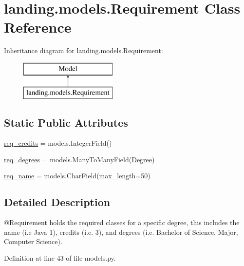 \hypertarget{classlanding_1_1models_1_1Requirement}{}\section{landing.\+models.\+Requirement Class Reference}
\label{classlanding_1_1models_1_1Requirement}
Inheritance diagram for landing.\+models.\+Requirement\+:\begin{figure}[H]
\begin{center}
\leavevmode
\includegraphics[height=2.000000cm]{classlanding_1_1models_1_1Requirement}
\end{center}
\end{figure}
\subsection*{Static Public Attributes}
\begin{DoxyCompactItemize}
\item 
\mbox{\hyperlink{classlanding_1_1models_1_1Requirement_a89e4f0cb28049b5e23d26f96bf23fe1b}{req\+\_\+credits}} = models.\+Integer\+Field()
\item 
\mbox{\hyperlink{classlanding_1_1models_1_1Requirement_a1308b8c10928402f769fddebf28dd05c}{req\+\_\+degrees}} = models.\+Many\+To\+Many\+Field(\mbox{\hyperlink{classlanding_1_1models_1_1Degree}{Degree}})
\item 
\mbox{\hyperlink{classlanding_1_1models_1_1Requirement_aae1f2fa53a3240a83cf827b942ac2ef2}{req\+\_\+name}} = models.\+Char\+Field(max\+\_\+length=50)
\end{DoxyCompactItemize}


\subsection{Detailed Description}
\begin{DoxyVerb}@Requirement holds the required classes for a specific degree, this includes the
        name (i.e Java 1), credits (i.e. 3),
        and degrees (i.e. Bachelor of Science, Major, Computer Science).
\end{DoxyVerb}
 

Definition at line 43 of file models.\+py.



